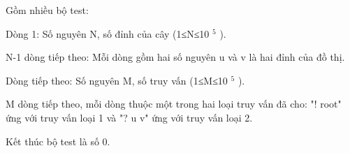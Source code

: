 Gồm nhiều bộ test:  

   Dòng 1: Số nguyên N, số đỉnh của cây (1≤N≤10   $^    5   $   ).  

   N-1 dòng tiếp theo: Mỗi dòng gồm hai số nguyên u và v là hai đỉnh của đồ thị.  

   Dòng tiếp theo: Số nguyên M, số truy vấn (1≤M≤10   $^    5   $   ).  

   M dòng tiếp theo, mỗi dòng thuộc một trong hai loại truy vấn đã cho: "! root" ứng với truy vấn loại 1 và "? u v" ứng với truy vấn loại 2.  

   Kết thúc bộ test là số 0.